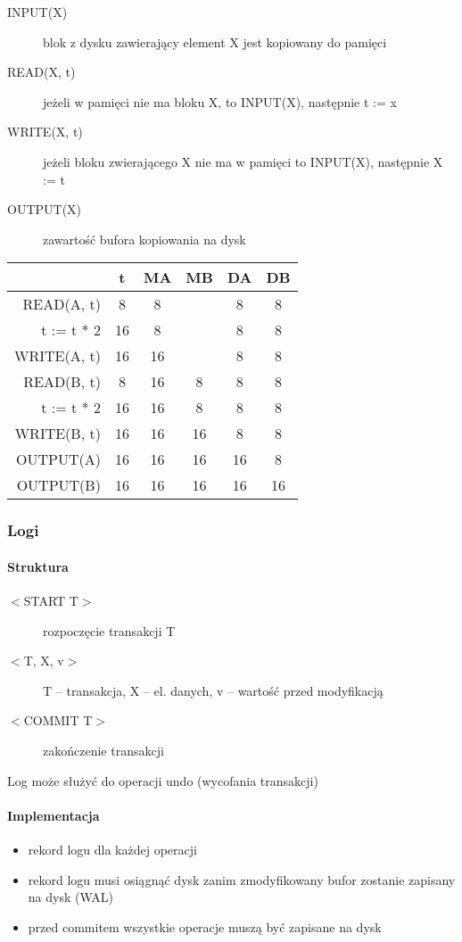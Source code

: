 \documentclass[12pt]{article}
\begin{document}
\begin{description}
  \item[INPUT(X)] blok z dysku zawierający element X jest kopiowany do pamięci
  \item[READ(X, t)] jeżeli w pamięci nie ma bloku X, to INPUT(X), następnie t := x
  \item[WRITE(X, t)] jeżeli bloku zwierającego X nie ma w pamięci to INPUT(X), następnie X := t
  \item[OUTPUT(X)] zawartość bufora kopiowania na dysk
\end{description}

\begin{tabular}{r|c|c|c|c|c}
           & t  & MA & MB & DA & DB \\
\hline
READ(A, t) & 8  & 8  &    & 8  & 8 \\
t := t * 2 & 16 & 8  &    & 8  & 8 \\
WRITE(A, t)& 16 & 16 &    & 8  & 8 \\
READ(B, t) & 8  & 16 & 8  & 8  & 8 \\
t := t * 2 & 16 & 16 & 8  & 8  & 8 \\
WRITE(B, t)& 16 & 16 & 16 & 8  & 8 \\
OUTPUT(A)  & 16 & 16 & 16 & 16 & 8 \\
OUTPUT(B)  & 16 & 16 & 16 & 16 &16 \\
\end{tabular}

\subsubsection{Logi}
\paragraph{Struktura}
\begin{description}
  \item[$<$START T$>$] rozpoczęcie transakcji T
  \item[$<$T, X, v$>$] T -- transakcja, X -- el. danych, v -- wartość przed modyfikacją
  \item[$<$COMMIT T$>$] zakończenie transakcji
\end{description}

Log może służyć do operacji undo (wycofania transakcji)

\paragraph{Implementacja}
\begin{itemize}
  \item rekord logu dla każdej operacji
  \item rekord logu musi osiągnąć dysk zanim zmodyfikowany bufor zostanie zapisany
     na dysk (\ac{WAL})
  \item przed commitem wszystkie operacje muszą być zapisane na dysk
\end{itemize}
\end{document}
